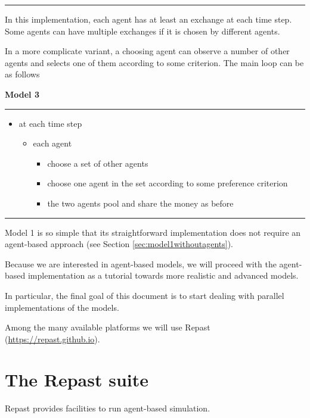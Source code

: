 \documentclass{article}
\providecommand{\tightlist}{%
  \setlength{\itemsep}{0pt}\setlength{\parskip}{0pt}}
\begin{document}
\vskip-2mm
\hrule

\vskip4mm

In this implementation, each agent has at least an exchange at each time
step. Some agents can have multiple exchanges if it is chosen by
different agents.

In a more complicate variant, a choosing agent can observe a number of other agents and selects one of them according to some criterion. The main loop can be as follows

\vskip2mm
\noindent\textbf{Model 3}
\vskip1mm
\hrule

\begin{itemize}
\tightlist
\item
  at each time step

  \begin{itemize}
  \tightlist
  \item
    each agent

    \begin{itemize}
    \tightlist
    \item
      choose a set of other agents
    \item
      choose one agent in the set according to some preference criterion
    \item
      the two agents pool and share the money as before
    \end{itemize}
  \end{itemize}
\end{itemize}

\vskip-2mm
\hrule

\vskip4mm

Model 1 is so simple that its straightforward implementation does not require an agent-based approach (see Section \ref{sec:model1withoutagents}).

Because we are interested in agent-based models, we will proceed with the agent-based implementation as a tutorial towards more realistic and advanced models.  

In particular, the final goal of this document is to start dealing with parallel implementations of the models. 

Among the many available platforms we will use Repast (\url{https://repast.github.io}).

\section{The Repast suite}

Repast provides facilities to run agent-based simulation.
\end{document}
